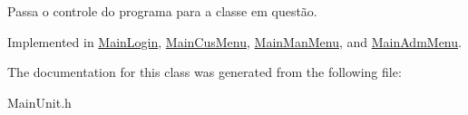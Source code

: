 Passa o controle do programa para a classe em questão. 



Implemented in \hyperlink{classMainLogin_ab0149573d015f41f401cfb28aea35509}{Main\-Login}, \hyperlink{classMainCusMenu_a91a3ffa75a1deb30dfc6eb604f1a1a2d}{Main\-Cus\-Menu}, \hyperlink{classMainManMenu_ac864c18863c5f308d0b9c52c223b4b9c}{Main\-Man\-Menu}, and \hyperlink{classMainAdmMenu_aa0c46ea4cc61cddfc75e7eb03f549832}{Main\-Adm\-Menu}.



The documentation for this class was generated from the following file\-:\begin{DoxyCompactItemize}
\item 
Main\-Unit.\-h\end{DoxyCompactItemize}
